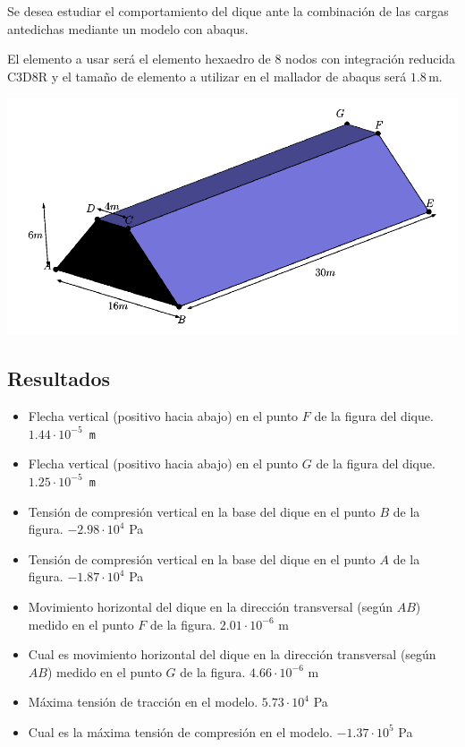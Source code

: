 \documentclass[a4paper,12pt]{article}
\begin{document}
Se desea estudiar el comportamiento del dique ante la combinación de las cargas antedichas
mediante un modelo con abaqus.

El elemento a usar será el elemento hexaedro de 8 nodos con integración reducida C3D8R y el tamaño de elemento a utilizar 
en el mallador de abaqus será $1.8\,\text{m}$.


\begin{center}
\includegraphics[scale=1.0]{dique.pdf}
\end{center}



\subsection{Resultados}

\begin{itemize}
\item Flecha vertical (positivo hacia abajo) en el punto $F$ de la figura del dique.
    {\tt $1.44\cdot 10^{-5}$ m}
\item Flecha vertical (positivo hacia abajo) en el punto $G$ de la figura del dique.
    {\tt $1.25\cdot 10^{-5}$ m}
\item Tensión de compresión vertical en la base del dique en el  punto $B$ de la figura.
    {$-2.98\cdot 10^4$ Pa}
\item Tensión de compresión vertical en la base del dique en el  punto $A$ de la figura.
    {$-1.87\cdot 10^4$ Pa}
\item Movimiento horizontal del dique en la dirección transversal (según $AB$) medido en el punto $F$ de 
la figura.
    {$2.01\cdot 10^{-6}$ m}
\item Cual es movimiento horizontal del dique en la dirección transversal (según $AB$) medido en el punto $G$ de 
la figura.
    {$4.66\cdot 10^{-6}$ m}
\item Máxima tensión de tracción en el modelo.
    {$5.73\cdot 10^4$ Pa}
\item Cual es la máxima tensión de compresión en el modelo.
    {$-1.37\cdot 10^5$ Pa}
\end{itemize}
\end{document}
